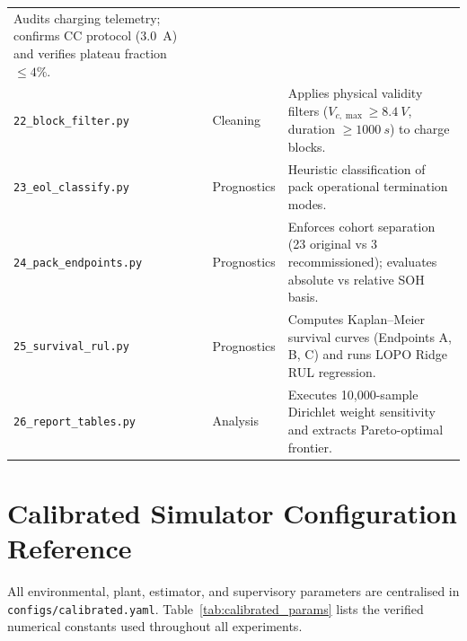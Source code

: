 \begin{center}
\begin{longtable}{>{\raggedright\footnotesize}p{4.4cm} >{\centering\arraybackslash}p{2.0cm} >{\raggedright\arraybackslash}p{7.4cm}}
  Audits charging telemetry; confirms CC protocol (\SI{3.0}{A}) and verifies plateau fraction $\le 4\%$. \\
  \texttt{22\_block\_filter.py} & Cleaning &
  Applies physical validity filters ($V_{c,\max} \ge \SI{8.4}{V}$, duration $\ge \SI{1000}{s}$) to charge blocks. \\
  \texttt{23\_eol\_classify.py} & Prognostics &
  Heuristic classification of pack operational termination modes. \\
  \texttt{24\_pack\_endpoints.py} & Prognostics &
  Enforces cohort separation (23 original vs 3 recommissioned); evaluates absolute vs relative SOH basis. \\
  \texttt{25\_survival\_rul.py} & Prognostics &
  Computes Kaplan--Meier survival curves (Endpoints A, B, C) and runs LOPO Ridge RUL regression. \\
  \texttt{26\_report\_tables.py} & Analysis &
  Executes 10{,}000-sample Dirichlet weight sensitivity and extracts Pareto-optimal frontier. \\
\end{longtable}
\end{center}

\section{Calibrated Simulator Configuration Reference}

All environmental, plant, estimator, and supervisory parameters are
centralised in \texttt{configs/calibrated.yaml}. Table~\ref{tab:calibrated_params}
lists the verified numerical constants used throughout all experiments.

